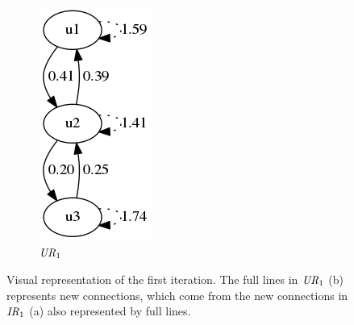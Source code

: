 \begin{figure}[h!]
\begin{subfigure}[h!]{0.15\textwidth}
        \includegraphics[width=\textwidth]{fig/example_run/user_user_ur1.png}
        \caption{$\mathit{UR}_1$}
        \label{fig:link:ur1}
    \end{subfigure}
    \caption{Visual representation of the first iteration. The full lines in $\mathit{UR}_1$ (b) represents new connections, which come from the new connections in $\mathit{IR}_1$ (a) also represented by full lines.}
    \label{fig:link:it1}
\end{figure}

